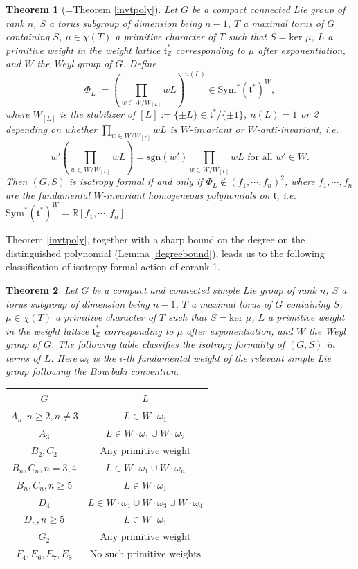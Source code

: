 \documentclass[11pt]{amsart}
\theoremstyle{plain}
\newtheorem{theorem}{Theorem}[section]
\theoremstyle{definition}
\begin{document}
\begin{theorem}[=Theorem \ref{invtpoly}]
	Let $G$ be a compact connected Lie group of rank $n$, $S$ a torus subgroup of dimension being $n-1$, $T$ a maximal torus of $G$ containing $S$, $\mu\in \chi(T)$ a primitive character of $T$ such that $S=\text{ker }\mu$, $L$ a primitive weight in the weight lattice $\mathfrak{t}^*_\mathbb{Z}$ corresponding to $\mu$ after exponentiation, and $W$ the Weyl group of $G$. Define
	\[\Phi_L:=\left(\prod_{w\in W/W_{[L]}} wL\right)^{n(L)}\in \text{Sym}^*(\mathfrak{t}^*)^W,\]
	where $W_{[L]}$ is the stabilizer of $[L]:=\{\pm L\}\in \mathfrak{t}^*/\{\pm 1\}$, $n(L)=1$ or 2 depending on whether $\displaystyle\prod_{w\in W/W_{[L]}}wL$ is $W$-invariant or $W$-anti-invariant, i.e. 
	\[\displaystyle w'(\prod_{w\in W/W_{[L]}}wL)=\text{sgn}(w')\prod_{w\in W/W_{[L]}}wL\text{ for all }w'\in W.\] 
	Then $(G, S)$ is isotropy formal if and only if $\Phi_L\notin (f_1, \cdots, f_n)^2$, where $f_1, \cdots, f_n$ are the fundamental $W$-invariant homogeneous polynomials on $\mathfrak{t}$, i.e. $\text{Sym}^*(\mathfrak{t}^*)^W=\mathbb{R}[f_1, \cdots, f_n]$.
\end{theorem}
Theorem \ref{invtpoly}, together with a sharp bound on the degree on the distinguished polynomial (Lemma \ref{degreebound}), leads us to the following classification of isotropy formal action of corank 1.
\begin{theorem}\label{corank1}
		Let $G$ be a compact and connected simple Lie group of rank $n$, $S$ a torus subgroup of dimension being $n-1$, $T$ a maximal torus of $G$ containing $S$, $\mu\in \chi(T)$ a primitive character of $T$ such that $S=\text{ker }\mu$, $L$ a primitive weight in the weight lattice $\mathfrak{t}^*_\mathbb{Z}$ corresponding to $\mu$ after exponentiation, and $W$ the Weyl group of $G$. The following table classifies the isotropy formality of $(G, S)$ in terms of $L$. Here $\omega_i$ is the $i$-th fundamental weight of the relevant simple Lie group following the Bourbaki convention.
		\begin{center}
		\begin{tabular}{|c|c|}
		\hline
		$G$&$L$\\
		\hline
		$A_n, n\geq 2, n\neq 3$& $L\in W\cdot \omega_1$\\
		\hline
		$A_3$&$L\in W\cdot \omega_1\cup W\cdot \omega_2$\\
		\hline
		$B_2, C_2$&$\text{Any primitive weight}$\\
		\hline
		$B_n, C_n, n=3, 4$&$L\in W\cdot \omega_1\cup W\cdot \omega_n$\\
		\hline
		$B_n, C_n, n\geq 5$&$L\in W\cdot \omega_1$\\
		\hline
		$D_4$&$L\in W\cdot\omega_1\cup W\cdot \omega_3\cup W\cdot \omega_4$\\
		\hline
		$D_n, n\geq 5$&$L\in W\cdot \omega_1$\\
		\hline
		$G_2$&$\text{Any primitive weight}$\\
		\hline
		$F_4, E_6, E_7, E_8$&$\text{No such primitive weights}$\\
		\hline
		\end{tabular}
		\end{center}
\end{theorem}
\end{document}

